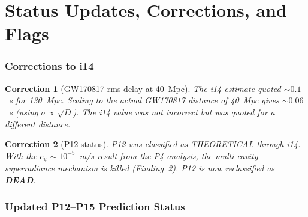 \documentclass[11pt]{article}
\newtheorem{correction}{Correction}
\begin{document}
\part{Status Updates, Corrections, and Flags}

\section{Corrections to i14}

\begin{correction}[GW170817 rms delay at 40~Mpc]
The i14 estimate quoted $\sim 0.1$~s for 130~Mpc. Scaling to the
actual GW170817 distance of 40~Mpc gives $\sim 0.06$~s (using
$\sigma \propto \sqrt{D}$). The i14 value was not incorrect but
was quoted for a different distance.
\end{correction}

\begin{correction}[P12 status]
P12 was classified as THEORETICAL through i14. With the
$c_\psi \sim 10^{-5}$~m/s result from the P4 analysis, the
multi-cavity superradiance mechanism is killed (Finding~2). P12
is now reclassified as \textbf{DEAD}.
\end{correction}

\section{Updated P12--P15 Prediction Status}
\end{document}
